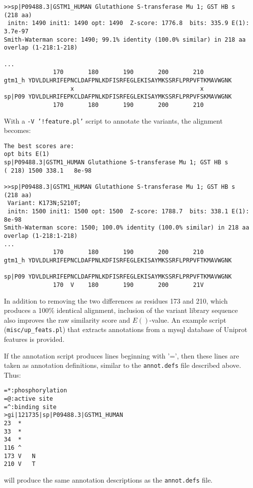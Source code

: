 \documentclass[11pt]{article}
\begin{document}
\begin{description}
\begin{footnotesize}
\begin{verbatim}
>>sp|P09488.3|GSTM1_HUMAN Glutathione S-transferase Mu 1; GST HB s            (218 aa)
 initn: 1490 init1: 1490 opt: 1490  Z-score: 1776.8  bits: 335.9 E(1): 3.7e-97
Smith-Waterman score: 1490; 99.1% identity (100.0% similar) in 218 aa overlap (1-218:1-218)

...
              170       180       190       200       210        
gtm1_h YDVLDLHRIFEPNCLDAFPNLKDFISRFEGLEKISAYMKSSRFLPRPVFTKMAVWGNK
                   x                                    x        
sp|P09 YDVLDLHRIFEPKCLDAFPNLKDFISRFEGLEKISAYMKSSRFLPRPVFSKMAVWGNK
              170       180       190       200       210        
\end{verbatim}
\end{footnotesize}

With a \texttt{-V '!feature.pl'} script to annotate the variants,
the alignment becomes:
\begin{footnotesize}
\begin{verbatim}
The best scores are:                                                          opt bits E(1)
sp|P09488.3|GSTM1_HUMAN Glutathione S-transferase Mu 1; GST HB s       ( 218) 1500 338.1   8e-98

>>sp|P09488.3|GSTM1_HUMAN Glutathione S-transferase Mu 1; GST HB s            (218 aa)
 Variant: K173N;S210T;
 initn: 1500 init1: 1500 opt: 1500  Z-score: 1788.7  bits: 338.1 E(1): 8e-98
Smith-Waterman score: 1500; 100.0% identity (100.0% similar) in 218 aa overlap (1-218:1-218)
...
              170       180       190       200       210        
gtm1_h YDVLDLHRIFEPNCLDAFPNLKDFISRFEGLEKISAYMKSSRFLPRPVFTKMAVWGNK
                                                                 
sp|P09 YDVLDLHRIFEPNCLDAFPNLKDFISRFEGLEKISAYMKSSRFLPRPVFTKMAVWGNK
              170  V    180       190       200       21V        
\end{verbatim}
\end{footnotesize}
In addition to removing the two differences as residues 173 and 210,
which produces a 100\% identical alignment, inclusion of the variant
library sequence also improves the raw similarity score and $E()$-value.
An example script (\texttt{misc/up\_feats.pl}) that extracts
annotations from a mysql database of Uniprot features is provided.

If the annotation script produces lines beginning with '=', then these
lines are taken as annotation definitions, similar to the
\texttt{annot.defs} file described above.  Thus:
\begin{footnotesize}
\begin{verbatim}
=*:phosphorylation
=@:active site
=^:binding site
>gi|121735|sp|P09488.3|GSTM1_HUMAN
23	*	
33	*	
34	*	
116	^	
173	V	N
210	V	T
\end{verbatim}
\end{footnotesize}
will produce the same annotation descriptions as the
\texttt{annot.defs} file.


\end{description}
\end{document}
